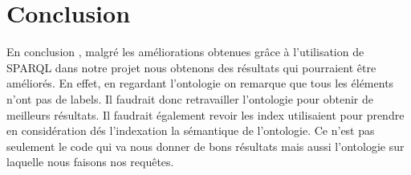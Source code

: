 \documentclass{article}
\begin{document}
\section{Conclusion}

En conclusion , malgré les améliorations obtenues grâce à l’utilisation de SPARQL
dans notre projet nous obtenons des résultats qui pourraient être améliorés. En
effet, en regardant l’ontologie on remarque que tous les éléments n’ont pas de
labels. Il faudrait donc retravailler l’ontologie pour obtenir de meilleurs
résultats. Il faudrait également revoir les index utilisaient pour prendre en
considération dés l'indexation la sémantique de l’ontologie. Ce n’est pas seulement
le code qui va nous donner de bons résultats mais aussi l’ontologie sur laquelle nous
faisons nos requêtes. 
\end{document}
